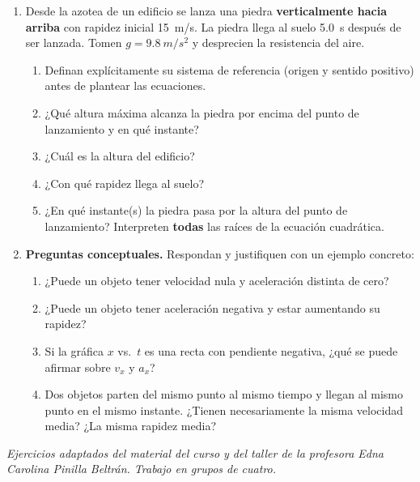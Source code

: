 \documentclass[11pt,letterpaper]{article}
\begin{document}
\begin{enumerate}[resume]
		\newpage
		
		\item Desde la azotea de un edificio se lanza una piedra \textbf{verticalmente hacia arriba} con rapidez inicial \SI{15}{m/s}. La piedra llega al suelo \SI{5,0}{s} después de ser lanzada. Tomen $g = \SI{9,8}{m/s^2}$ y desprecien la resistencia del aire.
		\begin{enumerate}
			\item Definan explícitamente su sistema de referencia (origen y sentido positivo) antes de plantear las ecuaciones.
			\item ¿Qué altura máxima alcanza la piedra por encima del punto de lanzamiento y en qué instante?
			\item ¿Cuál es la altura del edificio?
			\item ¿Con qué rapidez llega al suelo?
			\item ¿En qué instante(s) la piedra pasa por la altura del punto de lanzamiento? Interpreten \textbf{todas} las raíces de la ecuación cuadrática.
		\end{enumerate}
		
		
		\item \textbf{Preguntas conceptuales.} Respondan y justifiquen con un ejemplo concreto:
		\begin{enumerate}
			\item ¿Puede un objeto tener velocidad nula y aceleración distinta de cero?
			\item ¿Puede un objeto tener aceleración negativa y estar aumentando su rapidez?
			\item Si la gráfica $x$ vs.\ $t$ es una recta con pendiente negativa, ¿qué se puede afirmar sobre $v_x$ y $a_x$?
			\item Dos objetos parten del mismo punto al mismo tiempo y llegan al mismo punto en el mismo instante. ¿Tienen necesariamente la misma velocidad media? ¿La misma rapidez media?
		\end{enumerate}
	\end{enumerate}
	
	\newpage
	
	
	\vspace{0.6em}
	\noindent\small\textit{Ejercicios adaptados del material del curso y del taller de la profesora Edna Carolina Pinilla Beltrán. Trabajo en grupos de cuatro.}
	
\end{document}
